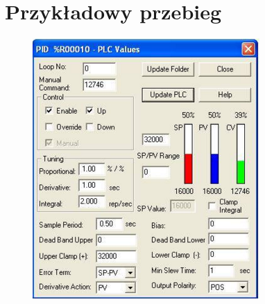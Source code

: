 \documentclass[a4paper, 12pt]{article}
\begin{document}
	\section{Przykładowy przebieg}
		\begin{figure}[H]
			\centering
			\includegraphics[]{./img/bonzo.png}
		\end{figure}
\end{document}
